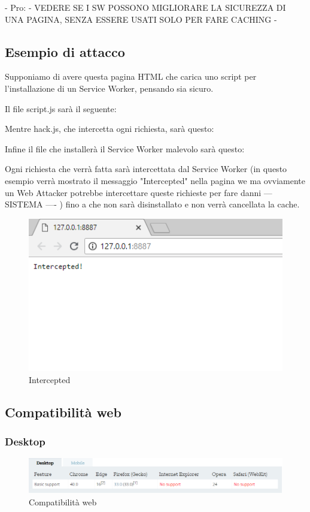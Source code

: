 \documentclass[11pt ,a4paper , twoside , openright ]{article}
\begin{document}
- Pro: - VEDERE SE I SW POSSONO MIGLIORARE LA SICUREZZA DI UNA PAGINA, SENZA ESSERE USATI SOLO PER FARE CACHING -
\newpage
\subsection{Esempio di attacco}
Supponiamo di avere questa pagina HTML che carica uno script per l'installazione di un Service Worker, pensando sia sicuro.

Il file script.js sarà il seguente:

\pagebreak
Mentre hack.js, che intercetta ogni richiesta, sarà questo:

Infine il file che installerà il Service Worker malevolo sarà questo:

Ogni richiesta che verrà fatta sarà intercettata dal Service Worker (in questo esempio verrà mostrato il messaggio "Intercepted" nella pagina we ma ovviamente un Web Attacker potrebbe intercettare queste richieste per fare danni --- SISTEMA ---- ) fino a che non sarà disinstallato e non verrà cancellata la cache.
\begin{figure}[h]
	\centering
	\includegraphics[width=0.7\linewidth]{Intercepted}
	\caption{Intercepted}
	\label{fig: Intercepted}
\end{figure}

\newpage
\subsection{Compatibilità web}
\subsubsection{Desktop}
\begin{figure}[h]
	\centering
	\includegraphics[width=1\linewidth]{CompWeb}
	\caption{Compatibilità web}
	\label{fig:Compatibilità web}
\end{figure}
\end{document}
